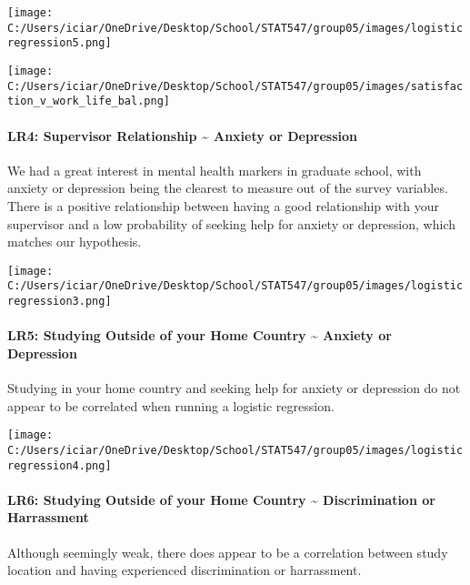 \documentclass[
]{article}
\begin{document}
\texttt{[image: C:/Users/iciar/OneDrive/Desktop/School/STAT547/group05/images/logisticregression5.png]}

\texttt{[image: C:/Users/iciar/OneDrive/Desktop/School/STAT547/group05/images/satisfaction\_v\_work\_life\_bal.png]}

\hypertarget{lr4-supervisor-relationship-anxiety-or-depression}{%
\paragraph{LR4: Supervisor Relationship \textasciitilde{} Anxiety or
Depression}\label{lr4-supervisor-relationship-anxiety-or-depression}}

We had a great interest in mental health markers in graduate school,
with anxiety or depression being the clearest to measure out of the
survey variables. There is a positive relationship between having a good
relationship with your supervisor and a low probability of seeking help
for anxiety or depression, which matches our hypothesis.

\texttt{[image: C:/Users/iciar/OneDrive/Desktop/School/STAT547/group05/images/logisticregression3.png]}

\hypertarget{lr5-studying-outside-of-your-home-country-anxiety-or-depression}{%
\paragraph{LR5: Studying Outside of your Home Country \textasciitilde{}
Anxiety or
Depression}\label{lr5-studying-outside-of-your-home-country-anxiety-or-depression}}

Studying in your home country and seeking help for anxiety or depression
do not appear to be correlated when running a logistic regression.

\texttt{[image: C:/Users/iciar/OneDrive/Desktop/School/STAT547/group05/images/logisticregression4.png]}

\hypertarget{lr6-studying-outside-of-your-home-country-discrimination-or-harrassment}{%
\paragraph{LR6: Studying Outside of your Home Country \textasciitilde{}
Discrimination or
Harrassment}\label{lr6-studying-outside-of-your-home-country-discrimination-or-harrassment}}

Although seemingly weak, there does appear to be a correlation between
study location and having experienced discrimination or harrassment.
\end{document}
